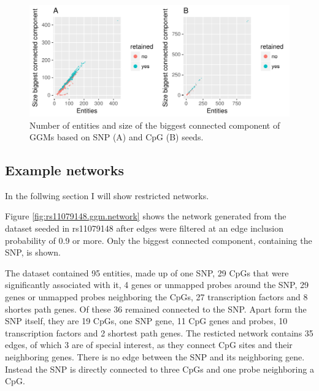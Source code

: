 \documentclass[a4paper,12pt,twoside,openright]{report}
\begin{document}
\begin{figure}[tb]
	\includegraphics[scale = 1, keepaspectratio = true]{../figures/hervS2_ggm_entity_cc_size_scatter}  
	\caption{Number of entities and size of the biggest connected component of GGMs based on SNP (A) and CpG (B) seeds.}
    \label{fig:ggm.entity.cc.scatter}
\end{figure}

\subsection{Example networks}
\label{Results:Example networks}
In the follwing section I will show restricted networks. 

Figure \ref{fig:rs11079148.ggm.network} shows the network generated from the dataset seeded in rs11079148 after edges were filtered at an edge inclusion probability of 0.9 or more. Only the biggest connected component, containing the SNP, is shown. 

The dataset contained 95 entities, made up of one SNP, 29 CpGs that were significantly associated with it, 4 genes or unmapped probes around the SNP, 29 genes or unmapped probes neighboring the CpGs, 27 transcription factors and 8 shortes path genes. Of these 36 remained connected to the SNP. Apart form the SNP itself, they are 19 CpGs, one SNP gene, 11 CpG genes and probes, 10 transcription factors and 2 shortest path genes. The resticted network contains 35 edges, of which 3 are of special interest, as they connect CpG sites and their neighboring genes. There is no edge between the SNP and its neighboring gene. Instead the SNP is directly connected to three CpGs and one probe neighboring a CpG. 
\end{document}
